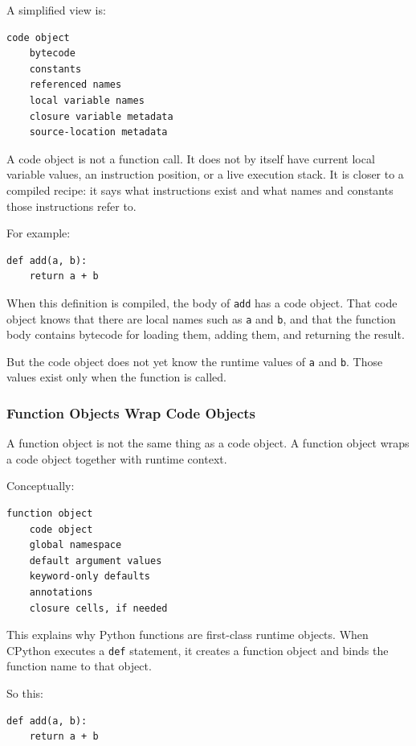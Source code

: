 A simplified view is:

\begin{verbatim}
code object
    bytecode
    constants
    referenced names
    local variable names
    closure variable metadata
    source-location metadata
\end{verbatim}

A code object is not a function call. It does not by itself have current local variable values, an instruction position, or a live execution stack. It is closer to a compiled recipe: it says what instructions exist and what names and constants those instructions refer to.

For example:

\begin{verbatim}
def add(a, b):
    return a + b
\end{verbatim}

When this definition is compiled, the body of \texttt{add} has a code object. That code object knows that there are local names such as \texttt{a} and \texttt{b}, and that the function body contains bytecode for loading them, adding them, and returning the result.

But the code object does not yet know the runtime values of \texttt{a} and \texttt{b}. Those values exist only when the function is called.

\subsubsection{Function Objects Wrap Code Objects}

A function object is not the same thing as a code object. A function object wraps a code object together with runtime context.

Conceptually:

\begin{verbatim}
function object
    code object
    global namespace
    default argument values
    keyword-only defaults
    annotations
    closure cells, if needed
\end{verbatim}

This explains why Python functions are first-class runtime objects. When CPython executes a \texttt{def} statement, it creates a function object and binds the function name to that object.

So this:

\begin{verbatim}
def add(a, b):
    return a + b
\end{verbatim}


